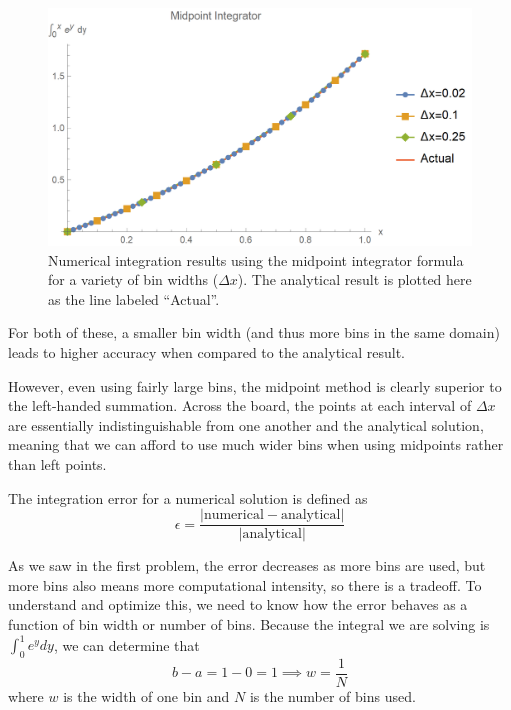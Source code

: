 \documentclass{article}
\begin{document}
\begin{figure}[!h]
    \centering
    \includegraphics[width=4.75in]{homework2/P1_MP.png}
    \caption{Numerical integration results using the midpoint integrator formula for a variety of bin widths ($\Delta x$). The analytical result is plotted here as the line labeled ``Actual''.}
    \label{fig:p1_mid}
\end{figure}

For both of these, a smaller bin width (and thus more bins in the same domain) leads to higher accuracy when compared to the analytical result.

However, even using fairly large bins, the midpoint method is clearly superior to the left-handed summation. Across the board, the points at each interval of $\Delta x$ are essentially indistinguishable from one another and the analytical solution, meaning that we can afford to use much wider bins when using midpoints rather than left points.

\bigskip
{}
\medskip

The integration error for a numerical solution is defined as
\begin{equation}\label{eq:error}
    \epsilon = \frac{|\text{numerical} - \text{analytical}|}{|\text{analytical}|}
\end{equation}

As we saw in the first problem, the error decreases as more bins are used, but more bins also means more computational intensity, so there is a tradeoff. To understand and optimize this, we need to know how the error behaves as a function of bin width or number of bins. Because the integral we are solving is $\int_0^1 e^y dy$, we can determine that
\begin{equation}
    b-a = 1-0 = 1 \implies w = \frac{1}{N}
\end{equation}
where $w$ is the width of one bin and $N$ is the number of bins used.
\end{document}
